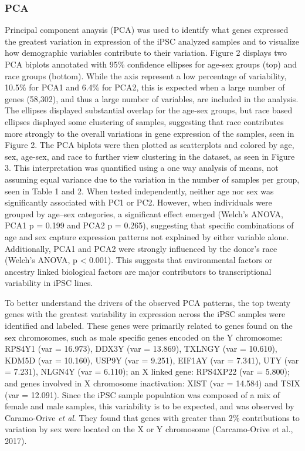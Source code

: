 \documentclass[
  letterpaper,
  DIV=11,
  numbers=noendperiod]{scrartcl}
\begin{document}
\subsubsection{PCA}\label{pca}

Principal component anaysis (PCA) was used to identify what genes
expressed the greatest variation in expression of the iPSC analyzed
samples and to visualize how demographic variables contribute to their
variation. Figure 2 displays two PCA biplots annotated with 95\%
confidence ellipses for age-sex groups (top) and race groups (bottom).
While the axis represent a low percentage of variability, 10.5\% for
PCA1 and 6.4\% for PCA2, this is expected when a large number of genes
(58,302), and thus a large number of variables, are included in the
analysis. The ellipses displayed substantial overlap for the age-sex
groups, but race based ellipses displayed some clustering of samples,
suggesting that race contributes more strongly to the overall variations
in gene expression of the samples, seen in Figure 2. The PCA biplots
were then plotted as scatterplots and colored by age, sex, age-sex, and
race to further view clustering in the dataset, as seen in Figure 3.
This interpretation was quantified using a one way analysis of means,
not assuming equal variance due to the variation in the number of
samples per group, seen in Table 1 and 2. When tested independently,
neither age nor sex was significantly associated with PC1 or PC2.
However, when individuals were grouped by age--sex categories, a
significant effect emerged (Welch's ANOVA, PCA1 p = 0.199 and PCA2 p =
0.265), suggesting that specific combinations of age and sex capture
expression patterns not explained by either variable alone.
Additionally, PCA1 and PCA2 were strongly influenced by the donor's race
(Welch's ANOVA, p \textless{} 0.001). This suggests that environmental
factors or ancestry linked biological factors are major contributors to
transcriptional variability in iPSC lines.

To better understand the drivers of the observed PCA patterns, the top
twenty genes with the greatest variability in expression across the iPSC
samples were identified and labeled. These genes were primarily related
to genes found on the sex chromosomes, such as male specific genes
encoded on the Y chromosome: RPS4Y1 (var = 16.973), DDX3Y (var =
13.869), TXLNGY (var = 10.610), KDM5D (var = 10.160), USP9Y (var =
9.251), EIF1AY (var = 7.341), UTY (var = 7.231), NLGN4Y (var = 6.110);
an X linked gene: RPS4XP22 (var = 5.800); and genes involved in X
chromosome inactivation: XIST (var = 14.584) and TSIX (var = 12.091).
Since the iPSC sample population was composed of a mix of female and
male samples, this variability is to be expected, and was observed by
Caramo-Orive \emph{et al}. They found that genes with greater than 2\%
contributions to variation by sex were located on the X or Y chromosome
(Carcamo-Orive et al., 2017).
\end{document}
